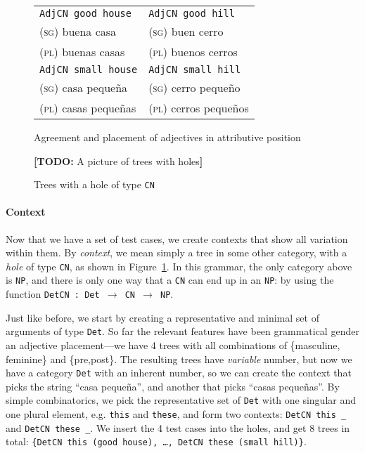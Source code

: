 \documentclass[11pt]{article}
\def\t#1{\texttt{#1}}
\newcommand{\todo}[1]{{\color{cyan}\textbf{[TODO: }#1\textbf{]}}}
\begin{document}
\begin{figure}
\centering
\begin{minipage}{.5\textwidth}
\centering
\begin{tabular}{| l | l |}
\hline
\t{AdjCN good house}   & \t{AdjCN good hill} \\ 
\textsc{(sg)} buena casa             & \textsc{(sg)} buen cerro \\
\textsc{(pl)} buenas casas           & \textsc{(pl)} buenos cerros \\ \hline

\t{AdjCN small house}   & \t{AdjCN small hill} \\ 
\textsc{(sg)} casa  peque\~{n}a            & \textsc{(sg)} cerro  peque\~{n}o \\
\textsc{(pl)} casas  peque\~{n}as          & \textsc{(pl)} cerros  peque\~{n}os \\ \hline
\end{tabular}
\caption{Agreement and placement of adjectives in attributive position}
\label{fig:adjAttr}
\end{minipage}%
\begin{minipage}{.5\textwidth}
  \centering
  \todo{A picture of trees with holes}
 \caption{Trees with a hole of type \t{CN}}
\label{fig:treesWithHoles}
\end{minipage}
\end{figure}


\paragraph{Context} 

Now that we have a set of test cases, we create contexts that show all
variation within them. By \emph{context}, we mean simply a tree in
some other category, with a \emph{hole} of type \t{CN}, as shown in
Figure~\ref{fig:treesWithHoles}. 
In this grammar, the only category above is \t{NP}, and there is only
one way that a \t{CN} can end up in an \t{NP}: by using the function
\t{DetCN : Det $\rightarrow$ CN $\rightarrow$ NP}. 

Just like before, we start by creating a representative and minimal
set of arguments of type \t{Det}. So far the relevant features have
been grammatical gender an adjective placement---we have 4 trees with
all combinations of \{masculine, feminine\} and \{pre,post\}. The
resulting trees have \emph{variable} number, but now we have a
category \t{Det} with an inherent number, so we can create the context
that picks the string ``casa  peque\~{n}a'', and another that picks
``casas  peque\~{n}as''. By simple combinatorics, we pick the
representative set of \t{Det} with one singular and one plural
element, e.g. \t{this} and \t{these}, and form two contexts:
\verb|DetCN this _| and  \verb|DetCN these _|. We insert the 4 test
cases into the holes, and get 8 trees in total: \t{\{DetCN this (good
  house), \dots, DetCN these (small hill)\}}. 
\end{document}
